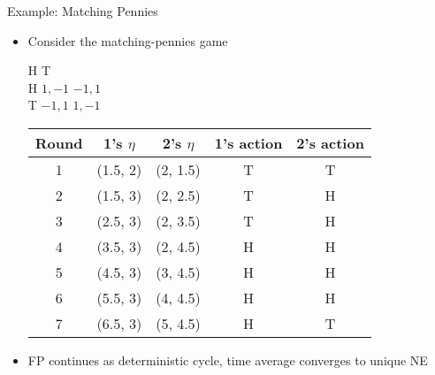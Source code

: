 \documentclass[11pt,aspectratio=169]{beamer}
\begin{document}
  
  \begin{frame}{Example: Matching Pennies}
   \begin{itemize}[<+->]
    \item Consider the matching-pennies game
    \begin{center}\scriptsize
     \hspace{-3.5em}
     \begin{game}{2}{2}
      	\> H			\> T		\\
      H	\> $1,-1$	\> $-1,1$	\\
      T	\> $-1,1$	\> $1,-1$
     \end{game}
    \end{center}
    \vspace{0.75em}
    \begin{center}
     \begin{tabular}{ccccc}
      Round	& 1's $\eta$	& 2's $\eta$	& 1's action	& 2's action			\\ \hline
      1		& (1.5, 2)	& (2, 1.5) 	& T			& T			\pause	\\
      2		& (1.5, 3)	& (2, 2.5) 	& T			& H			\pause	\\
      3		& (2.5, 3)	& (2, 3.5) 	& T			& H			\pause	\\
      4		& (3.5, 3)	& (2, 4.5) 	& H			& H			\pause	\\
      5		& (4.5, 3)	& (3, 4.5) 	& H			& H			\pause	\\
      6		& (5.5, 3)	& (4, 4.5) 	& H			& H			\pause	\\
      7		& (6.5, 3)	& (5, 4.5) 	& H			& T			\pause	\\
     \end{tabular}
    \end{center}
    \vspace{0.75em}
    \item FP continues as deterministic cycle, time average converges to unique NE
   \end{itemize}
  \end{frame}
  
\end{document}
